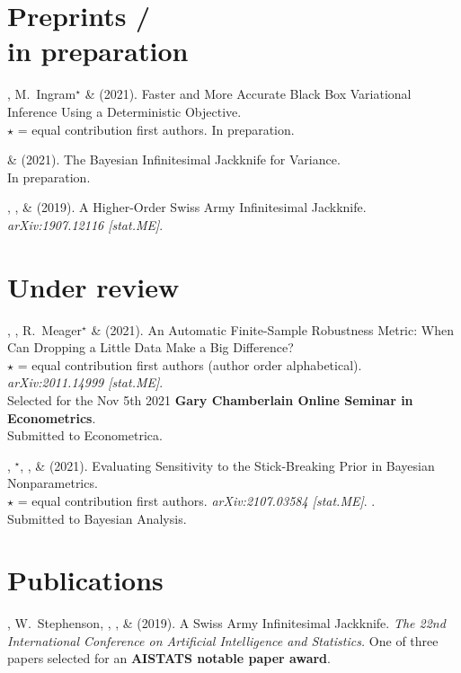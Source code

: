 \section{\sc Preprints / \\in preparation}


\mestar, M.~Ingram$^\star$ \& \tamara  (2021).
Faster and More Accurate Black Box Variational Inference Using a Deterministic Objective.\\
$\star$ = equal contribution first authors.
In preparation.

\me \& \tamara  (2021).
The Bayesian Infinitesimal Jackknife for Variance.\\
In preparation.

\me, \mike, \& \tamara (2019).
A Higher-Order Swiss Army Infinitesimal Jackknife.
\emph{arXiv:1907.12116 [stat.ME]}.

\section{\sc Under review}

\tamara, \mestar, R.~Meager$^\star$ \&  (2021).
An Automatic Finite-Sample Robustness Metric: When Can Dropping a Little Data
Make a Big Difference?\\
$\star$ = equal contribution first authors (author order alphabetical).
\emph{arXiv:2011.14999 [stat.ME]}. \\
Selected for the Nov 5th 2021 \textbf{Gary Chamberlain Online Seminar in Econometrics}.\\
Submitted to Econometrica.


\mestar, \runjing{}$^\star$, \mike, \& \tamara (2021).
Evaluating Sensitivity to the Stick-Breaking Prior in Bayesian Nonparametrics.\\
$\star$ = equal contribution first authors.
\emph{arXiv:2107.03584 [stat.ME]}.
.\\
Submitted to Bayesian Analysis.


\section{\sc Publications}

\me, W.~Stephenson, \runjing, \mike, \& \tamara (2019).  A Swiss Army Infinitesimal
Jackknife.  \emph{The 22nd International Conference on Artificial Intelligence
and Statistics.} 
One of three papers selected for an \textbf{AISTATS notable paper award}.


